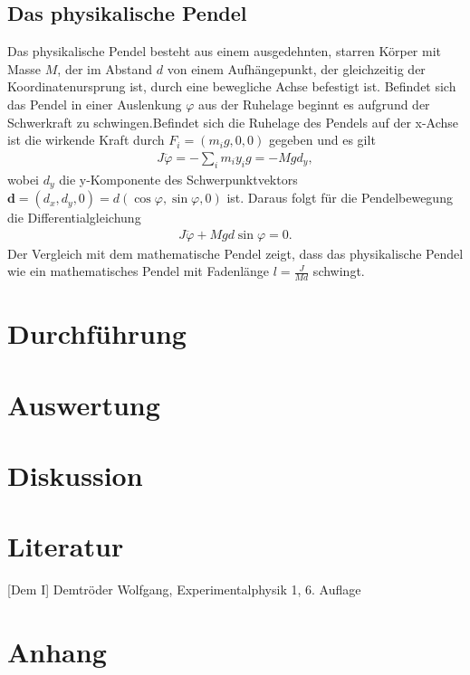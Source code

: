 \documentclass[12pt, a4paper, twoside]{scrartcl}
\begin{document}
\subsection{Das physikalische Pendel}
Das physikalische Pendel besteht aus einem ausgedehnten, starren Körper mit Masse $M$, der im Abstand $d$ von einem Aufhängepunkt, der gleichzeitig der Koordinatenursprung ist, durch eine bewegliche Achse befestigt ist. Befindet sich das Pendel in einer Auslenkung $\varphi$ aus der Ruhelage beginnt es aufgrund der Schwerkraft zu schwingen.Befindet sich die Ruhelage des Pendels auf der x-Achse ist die wirkende Kraft durch $F_i=(m_ig,0,0)$ gegeben und es gilt
\begin{align*}
J\ddot{\varphi}=-\sum_im_iy_ig=-Mgd_y,
\end{align*}
wobei $d_y$ die y-Komponente des Schwerpunktvektors $\mathbf d=(d_x,d_y,0)=d(\cos\varphi,\sin\varphi,0)$ ist. Daraus folgt für die Pendelbewegung die Differentialgleichung
\begin{align*}
J\ddot\varphi+Mgd\sin\varphi=0.
\end{align*}
Der Vergleich mit dem mathematische Pendel zeigt, dass das physikalische Pendel wie ein mathematisches Pendel mit Fadenlänge $l=\frac{J}{Md}$ schwingt. 




\section{Durchführung}
\label{sec:durchfuehrung}


\section{Auswertung}
\label{sec:auswertung}


\section{Diskussion}
\label{sec:diskussion}


\section*{Literatur}

[Dem I] Demtröder Wolfgang, Experimentalphysik 1, 6. Auflage

\newpage
\section*{Anhang}
\end{document}
